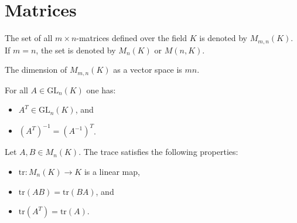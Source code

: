\section{Matrices}

    \begin{notation}\label{linalgebra:matrix_set}
        The set of all $m\times n$-matrices defined over the field $K$ is denoted by $M_{m,n}(K)$. If $m=n$, the set is denoted by $M_n(K)$ or $M(n,K)$.
    \end{notation}

    \begin{property}[Dimension]\label{linalgebra:dimension_of_matrix_space}
        The dimension of $M_{m,n}(K)$ as a vector space is $mn$.
    \end{property}

    \begin{property}
        For all $A\in\text{GL}_n(K)$ one has:
        \begin{itemize}
            \item $A^T\in\text{GL}_n(K)$, and
            \item $\left(A^T\right)^{-1}=\left(A^{-1}\right)^T$.
        \end{itemize}
    \end{property}

    \begin{property}\label{linalgebra:trace_commutative}
        Let $A, B\in M_n(K)$. The trace satisfies the following properties:
        \begin{itemize}
            \item $\text{tr}:M_n(K)\rightarrow K$ is a linear map,
            \item $\text{tr}(AB) = \text{tr}(BA)$, and
            \item $\text{tr}(A^T) = \text{tr}(A)$.
        \end{itemize}
    \end{property}

